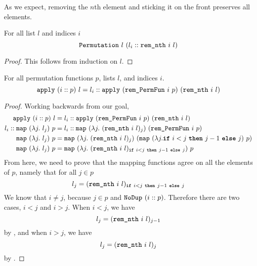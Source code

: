 \documentclass[11pt]{thesis}
\begin{document}
As we expect, removing the $n$th element and sticking it on the front
preserves all elements.
\begin{theorem}
  For all list $l$ and indices $i$
  \begin{equation*}
    \texttt{Permutation}~l~(l_i :: \texttt{rem\_nth}~i~l)
  \end{equation*}
\end{theorem}
\begin{proof}
  This follows from induction on $l$.
\end{proof}

\begin{theorem}
  For all permutation functions $p$, lists $l$, and indices $i$.
  \begin{equation*}
    \texttt{apply}~(i::p)~l =
    l_i :: \texttt{apply}~(\texttt{rem\_PermFun}~i~p)~(\texttt{rem\_nth}~i~l)
  \end{equation*}
\end{theorem}
\begin{proof}
  Working backwards from our goal,
  \begin{align*}
    \texttt{apply}~(i::p)~l &=
    l_i :: \texttt{apply}~(\texttt{rem\_PermFun}~i~p)~(\texttt{rem\_nth}~i~l) \\
    l_i :: \texttt{map}~(\lambda j.~l_j)~p &=
    l_i :: \texttt{map}~(\lambda j.~(\texttt{rem\_nth}~i~l)_j)~(\texttt{rem\_PermFun}~i~p) \\
    \texttt{map}~(\lambda j.~l_j)~p &=
    \texttt{map}~(\lambda j.~(\texttt{rem\_nth}~i~l)_j)~(\texttt{map}~(\lambda j. \texttt{\textbf{if}}~i < j~\texttt{\textbf{then}}~j-1~\texttt{\textbf{else}}~j)~p) \\
    \texttt{map}~(\lambda j.~l_j)~p &=
    \texttt{map}~(\lambda j.~(\texttt{rem\_nth}~i~l)_{\texttt{\textbf{if}}~i < j~\texttt{\textbf{then}}~j-1~\texttt{\textbf{else}}~j})~p \\
  \end{align*}
  From here, we need to prove that the mapping functions agree on all
  the elements of $p$, namely that for all $j \in p$
  \begin{equation*}
    l_j = (\texttt{rem\_nth}~i~l)_{\texttt{\textbf{if}}~i < j~\texttt{\textbf{then}}~j-1~\texttt{\textbf{else}}~j}
  \end{equation*}
  We know that $i \neq j$, because $j \in p$ and $\texttt{NoDup}~(i :: p)$.
  Therefore there are two cases, $i < j$ and $i > j$. When $i < j$, we have
  \begin{equation*}
    l_j = (\texttt{rem\_nth}~i~l)_{j-1}
  \end{equation*}
  by , and when $i > j$, we have
  \begin{equation*}
    l_j = (\texttt{rem\_nth}~i~l)_j
  \end{equation*}
  by .
\end{proof}
\end{document}
